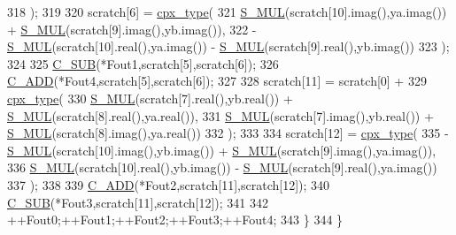 \begin{DoxyCode}
318                     );
319 
320             scratch[6] =  \hyperlink{classcudafft_a6b6e4901630f197baf4cf7f165543ece}{cpx\_type}( 
321                     \hyperlink{classcudafft_a3b3a4acd07911e5e3c27ae34347b7b4e}{S\_MUL}(scratch[10].imag(),ya.imag()) + \hyperlink{classcudafft_a3b3a4acd07911e5e3c27ae34347b7b4e}{S\_MUL}(scratch[9].imag(),yb.imag()),
322                     -\hyperlink{classcudafft_a3b3a4acd07911e5e3c27ae34347b7b4e}{S\_MUL}(scratch[10].real(),ya.imag()) - \hyperlink{classcudafft_a3b3a4acd07911e5e3c27ae34347b7b4e}{S\_MUL}(scratch[9].real(),yb.imag()) 
323                     );
324 
325             \hyperlink{classcudafft_a62e0deba21ac6217451ce410b0029812}{C\_SUB}(*Fout1,scratch[5],scratch[6]);
326             \hyperlink{classcudafft_a014fac9955f6dc417ae80544132f98e4}{C\_ADD}(*Fout4,scratch[5],scratch[6]);
327 
328             scratch[11] = scratch[0] + 
329                 \hyperlink{classcudafft_a6b6e4901630f197baf4cf7f165543ece}{cpx\_type}(
330                         \hyperlink{classcudafft_a3b3a4acd07911e5e3c27ae34347b7b4e}{S\_MUL}(scratch[7].real(),yb.real()) + \hyperlink{classcudafft_a3b3a4acd07911e5e3c27ae34347b7b4e}{S\_MUL}(scratch[8].real(),ya.real()),
331                         \hyperlink{classcudafft_a3b3a4acd07911e5e3c27ae34347b7b4e}{S\_MUL}(scratch[7].imag(),yb.real()) + \hyperlink{classcudafft_a3b3a4acd07911e5e3c27ae34347b7b4e}{S\_MUL}(scratch[8].imag(),ya.real())
332                         );
333 
334             scratch[12] = \hyperlink{classcudafft_a6b6e4901630f197baf4cf7f165543ece}{cpx\_type}(
335                     -\hyperlink{classcudafft_a3b3a4acd07911e5e3c27ae34347b7b4e}{S\_MUL}(scratch[10].imag(),yb.imag()) + \hyperlink{classcudafft_a3b3a4acd07911e5e3c27ae34347b7b4e}{S\_MUL}(scratch[9].imag(),ya.imag()),
336                     \hyperlink{classcudafft_a3b3a4acd07911e5e3c27ae34347b7b4e}{S\_MUL}(scratch[10].real(),yb.imag()) - \hyperlink{classcudafft_a3b3a4acd07911e5e3c27ae34347b7b4e}{S\_MUL}(scratch[9].real(),ya.imag())
337                     );
338 
339             \hyperlink{classcudafft_a014fac9955f6dc417ae80544132f98e4}{C\_ADD}(*Fout2,scratch[11],scratch[12]);
340             \hyperlink{classcudafft_a62e0deba21ac6217451ce410b0029812}{C\_SUB}(*Fout3,scratch[11],scratch[12]);
341 
342             ++Fout0;++Fout1;++Fout2;++Fout3;++Fout4;
343         \}
344     \}
\end{DoxyCode}
